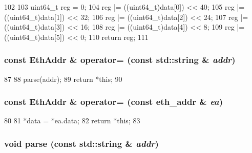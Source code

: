 \begin{DoxyCode}
102     {
103         uint64_t reg = 0;
104         reg |= ((uint64_t)data[0]) << 40;
105         reg |= ((uint64_t)data[1]) << 32;
106         reg |= ((uint64_t)data[2]) << 24;
107         reg |= ((uint64_t)data[3]) << 16;
108         reg |= ((uint64_t)data[4]) << 8;
109         reg |= ((uint64_t)data[5]) << 0;
110         return reg;
111     }
\end{DoxyCode}
\hypertarget{structNet_1_1EthAddr_a2e6f264148c68cd2bd0a77211f925eec}{
\subsubsection[{operator=}]{\setlength{\rightskip}{0pt plus 5cm}const {\bf EthAddr} \& operator= (const std::string \& {\em addr})}}
\label{structNet_1_1EthAddr_a2e6f264148c68cd2bd0a77211f925eec}



\begin{DoxyCode}
87 {
88     parse(addr);
89     return *this;
90 }
\end{DoxyCode}
\hypertarget{structNet_1_1EthAddr_aadea9643872fce4d806d30964030733e}{
\subsubsection[{operator=}]{\setlength{\rightskip}{0pt plus 5cm}const {\bf EthAddr} \& operator= (const eth\_\-addr \& {\em ea})}}
\label{structNet_1_1EthAddr_aadea9643872fce4d806d30964030733e}



\begin{DoxyCode}
80 {
81     *data = *ea.data;
82     return *this;
83 }
\end{DoxyCode}
\hypertarget{structNet_1_1EthAddr_ac5e1557023352646a8f2d30d06025d89}{
\subsubsection[{parse}]{\setlength{\rightskip}{0pt plus 5cm}void parse (const std::string \& {\em addr})}}
\label{structNet_1_1EthAddr_ac5e1557023352646a8f2d30d06025d89}



